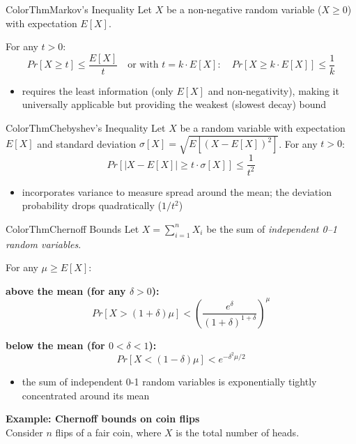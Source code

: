 \documentclass[a4paper, 11pt]{report}
\begin{document}
\begin{cframe}{ColorThm}{Markov's Inequality}{}
    Let $X$ be a non-negative random variable ($X \ge 0$) with expectation $E[X]$.

    For any $t > 0$:
    $$Pr[X \ge t] \le \frac{E[X]}{t} \quad \text{or with } t = k \cdot E[X]: \quad Pr[X \ge k \cdot E[X]] \le \frac{1}{k}$$
   
\begin{itemize}
    \item requires the least information (only $E[X]$ and non-negativity), making it universally applicable but providing the weakest (slowest decay) bound
\end{itemize}
\end{cframe}

\begin{cframe}{ColorThm}{Chebyshev's Inequality}{}
    Let $X$ be a random variable with expectation $E[X]$ and standard deviation $\sigma[X] = \sqrt{E[(X - E[X])^2]}$. For any $t > 0$:
    $$Pr[|X - E[X]| \ge t \cdot \sigma[X]] \le \frac{1}{t^2}$$
    
    \begin{itemize}
        \item incorporates variance to measure spread around the mean; the deviation probability drops quadratically ($1/t^2$)
    \end{itemize}
\end{cframe}

\begin{cframe}{ColorThm}{Chernoff Bounds}{}
    Let $X = \sum_{i=1}^n X_i$ be the sum of \textit{independent 0--1 random variables}. 

    For any $\mu \ge E[X]$:
    
    \textbf{above the mean (for any $\delta > 0$):}
    $$Pr[X > (1+\delta)\mu] < \left(\frac{e^\delta}{(1+\delta)^{1+\delta}}\right)^\mu$$
    
    \textbf{below the mean (for $0 < \delta < 1$):}
    $$Pr[X < (1-\delta)\mu] < e^{-\delta^2 \mu / 2}$$
    
    \begin{itemize}
        \item the sum of independent 0-1 random variables is exponentially tightly concentrated around its mean
    \end{itemize}
\end{cframe}
\newpage
\textbf{Example: Chernoff bounds on coin flips}\\
Consider $n$ flips of a fair coin, where $X$ is the total number of heads. 
\end{document}
